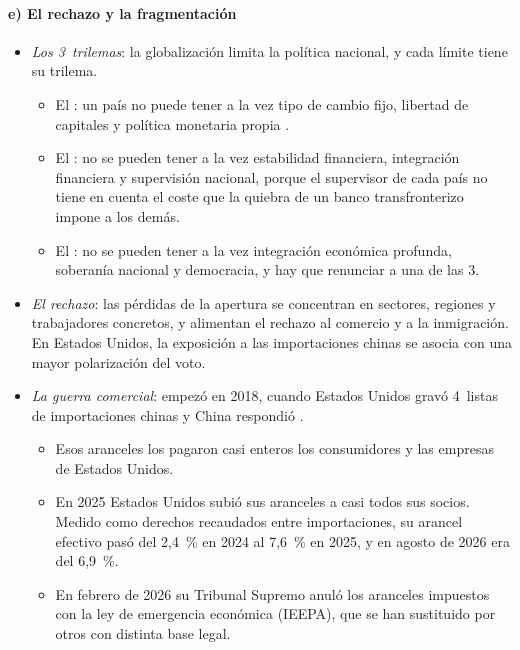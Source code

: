 \documentclass[11pt]{article}
\begin{document}
\paragraph{e) El rechazo y la fragmentación}

\begin{itemize}
\item \emph{Los 3~trilemas}: la globalización limita la política nacional, y cada límite tiene su trilema.
  \begin{itemize}
  \item El : un país no puede tener a la vez tipo de cambio fijo, libertad de capitales y política monetaria propia .
  \item El : no se pueden tener a la vez estabilidad financiera, integración financiera y supervisión nacional, porque el supervisor de cada país no tiene en cuenta el coste que la quiebra de un banco transfronterizo impone a los demás\nocite{Schoenmaker2011Trilemma}.
  \item El : no se pueden tener a la vez integración económica profunda, soberanía nacional y democracia, y hay que renunciar a una de las 3\nocite{Rodrik2000HowFar,Rodrik2011Paradox}.
  \end{itemize}
\item \emph{El rechazo}: las pérdidas de la apertura se concentran en sectores, regiones y trabajadores concretos, y alimentan el rechazo al comercio y a la inmigración. En Estados Unidos, la exposición a las importaciones chinas se asocia con una mayor polarización del voto\nocite{AutorDornHansonMajlesi2020}.
\item \emph{La guerra comercial}: empezó en 2018, cuando Estados Unidos gravó 4~listas de importaciones chinas y China respondió\nocite{USTR2026Seccion301} .
  \begin{itemize}
  \item Esos aranceles los pagaron casi enteros los consumidores y las empresas de Estados Unidos\nocite{Fajgelbaum2020Proteccionismo,Amiti2019Aranceles}.
  \item En 2025 Estados Unidos subió sus aranceles a casi todos sus socios. Medido como derechos recaudados entre importaciones, su arancel efectivo pasó del 2,4~\% en 2024 al 7,6~\% en 2025, y en agosto de 2026 era del 6,9~\%\nocite{USAFacts2026Arancel}.
  \item En febrero de 2026 su Tribunal Supremo anuló los aranceles impuestos con la ley de emergencia económica (IEEPA), que se han sustituido por otros con distinta base legal\nocite{JonesDay2026IEEPA}.

\end{itemize}
\end{itemize}
\end{document}
